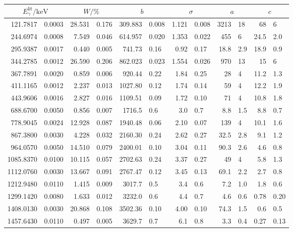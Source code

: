 \label{tab:a}
	\begin{tabular}{r@{${}\pm{}$}lr@{${}\pm{}$}lr@{${}\pm{}$}lr@{${}\pm{}$}lr@{${}\pm{}$}lr@{${}\pm{}$}l}
		\toprule
		\multicolumn{2}{c}{$E_\gamma^{\text{lit}}/\si{\kilo\electronvolt}$} & \multicolumn{2}{c}{$W/\si{\percent}$} & \multicolumn{2}{c}{$b$} & \multicolumn{2}{c}{$\sigma$} & \multicolumn{2}{c}{$a$} & \multicolumn{2}{c}{$c$} \\
		\midrule
		121.7817  & 0.0003 & 28.531 & 0.176 & 309.883 & 0.008 & 1.121 & 0.008 & 3213   & 18   & 68   & 6    \\
		244.6974  & 0.0008 & 7.549  & 0.046 & 614.957 & 0.020 & 1.353 & 0.022 & 455    &  6   & 24.5 & 2.0  \\
		295.9387  & 0.0017 & 0.440  & 0.005 & 741.73  & 0.16  & 0.92  & 0.17  & 18.8   & 2.9  & 18.9 & 0.9  \\
		344.2785  & 0.0012 & 26.590 & 0.206 & 862.023 & 0.023 & 1.554 & 0.026 & 970    & 13   & 15   & 6    \\
		367.7891  & 0.0020 & 0.859  & 0.006 & 920.44  & 0.22  & 1.84  & 0.25  & 28     &  4   & 11.2 & 1.3  \\
		411.1165  & 0.0012 & 2.237  & 0.013 & 1027.80 & 0.12  & 1.74  & 0.14  & 59     &  4   & 12.2 & 1.9  \\
		443.9606  & 0.0016 & 2.827  & 0.016 & 1109.51 & 0.09  & 1.72  & 0.10  & 71     &  4   & 10.8 & 1.8  \\
		688.6700  & 0.0050 & 0.856  & 0.007 & 1716.5  & 0.6   & 3.0   & 0.7   &  8.8   & 1.5  & 8.8  & 0.7  \\
		778.9045  & 0.0024 & 12.928 & 0.087 & 1940.48 & 0.06  & 2.10  & 0.07  & 139    &  4   & 10.1 & 1.6  \\
		867.3800  & 0.0030 & 4.228  & 0.032 & 2160.30 & 0.24  & 2.62  & 0.27  & 32.5   & 2.8  & 9.1  & 1.2  \\
		964.0570  & 0.0050 & 14.510 & 0.079 & 2400.01 & 0.10  & 3.04  & 0.11  & 90.3   & 2.6  & 4.6  & 0.8  \\
		1085.8370 & 0.0100 & 10.115 & 0.057 & 2702.63 & 0.24  & 3.37  & 0.27  & 49     &  4   & 5.8  & 1.3  \\
		1112.0760 & 0.0030 & 13.667 & 0.091 & 2767.47 & 0.12  & 3.45  & 0.13  & 69.1   & 2.2  & 2.7  & 0.8  \\
		1212.9480 & 0.0110 & 1.415  & 0.009 & 3017.7  & 0.5   & 3.4   & 0.6   &  7.2   & 1.0  & 1.8  & 0.6  \\
		1299.1420 & 0.0080 & 1.633  & 0.012 & 3232.0  & 0.6   & 4.4   & 0.7   &  4.6   & 0.6  & 0.78 & 0.20 \\
		1408.0130 & 0.0030 & 20.868 & 0.108 & 3502.36 & 0.10  & 4.00  & 0.10  & 74.3   & 1.5  & 0.6  & 0.5  \\
		1457.6430 & 0.0110 & 0.497  & 0.005 & 3629.7  & 0.7   & 6.1   & 0.8   &  3.3   & 0.4  & 0.27 & 0.13 \\
		\bottomrule
	\end{tabular}
